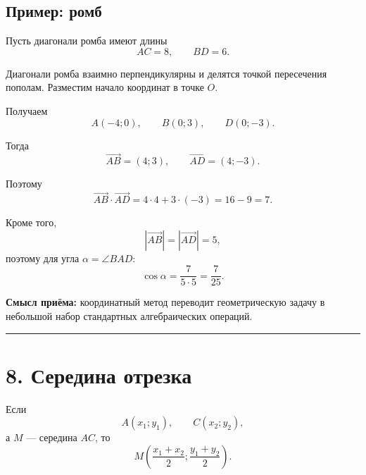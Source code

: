 \documentclass[a4paper,12pt]{article}
\newcommand{\vect}[1]{\overrightarrow{#1}}
\newcommand{\sectionline}{%
    \par\noindent
    {\color{linegray}\rule{\linewidth}{0.5pt}}
    \par
}
\begin{document}
\subsection*{\color{accent}Пример: ромб}

Пусть диагонали ромба имеют длины
\[
AC=8,
\qquad
BD=6.
\]

Диагонали ромба взаимно перпендикулярны и делятся точкой пересечения
пополам. Разместим начало координат в точке $O$.

\begin{center}
\end{center}

Получаем
\[
A(-4;0),
\qquad
B(0;3),
\qquad
D(0;-3).
\]

Тогда
\[
\vect{AB}=(4;3),
\qquad
\vect{AD}=(4;-3).
\]

Поэтому
\[
\vect{AB}\cdot\vect{AD}
=
4\cdot4+3\cdot(-3)
=
16-9
=
\boxed{7}.
\]

Кроме того,
\[
|\vect{AB}|=|\vect{AD}|=5,
\]
поэтому для угла $\alpha=\angle BAD$:
\[
\cos\alpha
=
\frac{7}{5\cdot5}
=
\boxed{\frac7{25}}.
\]

\textbf{Смысл приёма:}
координатный метод переводит геометрическую задачу в небольшой набор
стандартных алгебраических операций.

\sectionline

\section*{\color{darkaccent}8. Середина отрезка}

Если
\[
A(x_1;y_1),
\qquad
C(x_2;y_2),
\]
а $M$ --- середина $AC$, то
\[
\boxed{
M\left(
\frac{x_1+x_2}{2};
\frac{y_1+y_2}{2}
\right)
}.
\]
\end{document}

